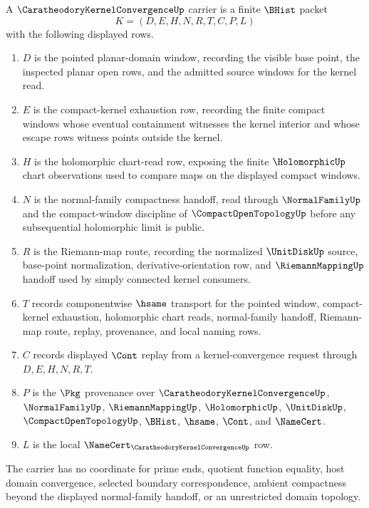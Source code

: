 \begin{definition}
\label{def:caratheodory-kernel-convergence-carrier}
A $\CaratheodoryKernelConvergenceUp$ carrier is a finite $\BHist$ packet
$$
K=(D,E,H,N,R,T,C,P,L)
$$
with the following displayed rows.
\begin{enumerate}
\item $D$ is the pointed planar-domain window, recording the visible base point, the inspected planar open rows, and the admitted source windows for the kernel read.
\item $E$ is the compact-kernel exhaustion row, recording the finite compact windows whose eventual containment witnesses the kernel interior and whose escape rows witness points outside the kernel.
\item $H$ is the holomorphic chart-read row, exposing the finite $\HolomorphicUp$ chart observations used to compare maps on the displayed compact windows.
\item $N$ is the normal-family compactness handoff, read through $\NormalFamilyUp$ and the compact-window discipline of $\CompactOpenTopologyUp$ before any subsequential holomorphic limit is public.
\item $R$ is the Riemann-map route, recording the normalized $\UnitDiskUp$ source, base-point normalization, derivative-orientation row, and $\RiemannMappingUp$ handoff used by simply connected kernel consumers.
\item $T$ records componentwise $\hsame$ transport for the pointed window, compact-kernel exhaustion, holomorphic chart reads, normal-family handoff, Riemann-map route, replay, provenance, and local naming rows.
\item $C$ records displayed $\Cont$ replay from a kernel-convergence request through $D,E,H,N,R,T$.
\item $P$ is the $\Pkg$ provenance over $\CaratheodoryKernelConvergenceUp$, $\NormalFamilyUp$, $\RiemannMappingUp$, $\HolomorphicUp$, $\UnitDiskUp$, $\CompactOpenTopologyUp$, $\BHist$, $\hsame$, $\Cont$, and $\NameCert$.
\item $L$ is the local $\NameCert_{\CaratheodoryKernelConvergenceUp}$ row.
\end{enumerate}
The carrier has no coordinate for prime ends, quotient function equality, host domain convergence, selected boundary correspondence, ambient compactness beyond the displayed normal-family handoff, or an unrestricted domain topology.
\end{definition}

